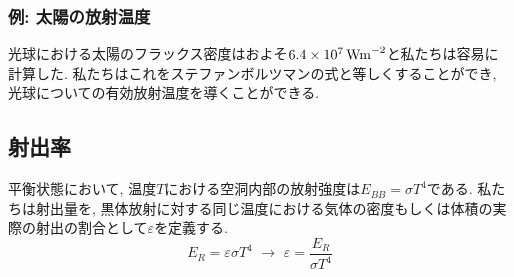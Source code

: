 \documentclass[a4j,12pt,openbib,oneside,dvipdfmx]{jbook}
\begin{document}
\subsubsection{例: 太陽の放射温度}
光球における太陽のフラックス密度はおよそ$6.4\times10^7\,\rm{Wm}^{-2}$と私たちは容易に計算した. 私たちはこれをステファンボルツマンの式と等しくすることができ, 光球についての有効放射温度を導くことができる. 

\subsection{射出率}
平衡状態において, 温度$T$における空洞内部の放射強度は$E_{BB}=\sigma{T^4}$である. 
私たちは射出量を, 黒体放射に対する同じ温度における気体の密度もしくは体積の実際の射出の割合として$\varepsilon$を定義する.
\begin{equation}
  E_R=\varepsilon\sigma{T^4} \,\,\to\,\, \varepsilon=\frac{E_R}{\sigma{T^4}}
\end{equation}
\newpage
{}
\end{document}
